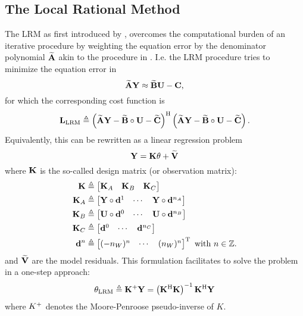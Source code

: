 \subsection{The Local Rational Method}
The \gls{LRM} as first introduced by \citep{McKelvey2012LRM}, overcomes the computational burden of an iterative procedure by weighting the equation error by the denominator polynomial $\widetilde{\mathbf{A}}$  akin to the procedure in \citep{Levy1959}.
I.e. the \gls{LRM} procedure tries to minimize the equation error in
\begin{equation}
  \widetilde{\mathbf{A}}\mathbf{Y} \approx \widetilde{\mathbf{B}} \mathbf{U}  - \mathbf{C}
  \text{,}
\end{equation}
for which the corresponding cost function is
\begin{equation}
  \mathbf{L_{\mathrm{LRM}}}
  \triangleq 
  \left( \widetilde{\mathbf{A}} \mathbf{Y}  -  \widetilde{\mathbf{B}} \circ \mathbf{U} - \widetilde{\mathbf{C}} \right)^{\mathrm{H}} 
      \left( \widetilde{\mathbf{A}} \mathbf{Y}  -  \widetilde{\mathbf{B}} \circ \mathbf{U} - \widetilde{\mathbf{C}} \right)
      \text{.}
\end{equation}
Equivalently, this can be rewritten as a linear regression problem
\begin{equation}
  \mathbf{Y} = \mathbf{K} \mathbf{\theta} + \widetilde{\mathbf{V}}
\end{equation}
where $\mathbf{K}$ is the so-called design matrix (or observation matrix):
\begin{align}
  \label{eq:design-matrix}
  \mathbf{K} 
    & \triangleq 
   \left[ \begin{matrix} 
     \mathbf{K}_A &
     \mathbf{K}_B & 
     \mathbf{K}_C
   \end{matrix} \right] \\
  \mathbf{K}_A 
    &\triangleq
     \left[ \begin{matrix} 
      \mathbf{Y} \circ \mathbf{d}^1 &
      \cdots &
      \mathbf{Y} \circ \mathbf{d}^{n_{A}}
     \end{matrix} \right] \\
  \mathbf{K}_B 
    &\triangleq
     \left[ \begin{matrix} 
      \mathbf{U} \circ \mathbf{d}^0 &
      \cdots &
      \mathbf{U} \circ \mathbf{d}^{n_{B}}
     \end{matrix} \right] \\
  \mathbf{K}_C
    &\triangleq
     \left[ \begin{matrix} 
      \mathbf{d}^0 &
      \cdots &
      \mathbf{d}^{n_{C}}
     \end{matrix} \right] \\
    \mathbf{d}^{n} & \triangleq
     \left[ \begin{matrix} 
      (-n_{W})^{n} &
      \cdots &
      (n_{W})^{n}
     \end{matrix} \right] ^{\mathrm{T}}
    \text{ with $n \in \mathbb{Z}$.}
\end{align}
and $\widetilde{\mathbf{V}}$ are the model residuals.
This formulation facilitates to solve the problem in a one-step approach:
\begin{equation}
  \mathbf{\theta}_{\mathrm{LRM}} 
    \triangleq \mathbf{K}^{+} \mathbf{Y}
    = \left( \mathbf{K}^{\mathrm{H}} \mathbf{K} \right)^{-1} \mathbf{K}^{\mathrm{H}} \mathbf{Y}
\end{equation}
where $K^{+}$ denotes the Moore-Penroose pseudo-inverse of $K$.


